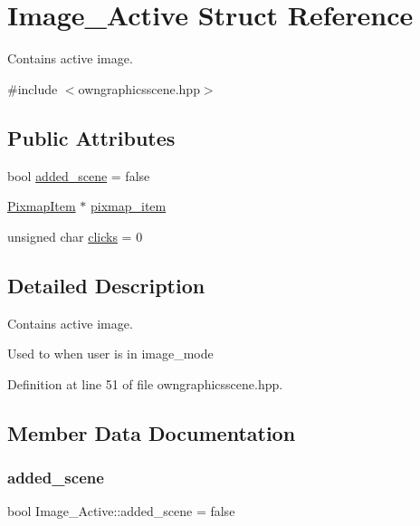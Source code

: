 \hypertarget{structImage__Active}{}\section{Image\+\_\+\+Active Struct Reference}
\label{structImage__Active}


Contains active image.  




{\ttfamily \#include $<$owngraphicsscene.\+hpp$>$}

\subsection*{Public Attributes}
\begin{DoxyCompactItemize}
\item 
bool \mbox{\hyperlink{structImage__Active_ac5eb10f5ca4ad81766c92a6ede6f7853}{added\+\_\+scene}} = false
\item 
\mbox{\hyperlink{classPixmapItem}{Pixmap\+Item}} $\ast$ \mbox{\hyperlink{structImage__Active_aa007ea3c9ba4830bbc2706af51820c20}{pixmap\+\_\+item}}
\item 
unsigned char \mbox{\hyperlink{structImage__Active_abb039226daf0372a8d88c842f5eb140f}{clicks}} = 0
\end{DoxyCompactItemize}


\subsection{Detailed Description}
Contains active image. 

Used to when user is in image\+\_\+mode 

Definition at line 51 of file owngraphicsscene.\+hpp.



\subsection{Member Data Documentation}
\mbox{\label{structImage__Active_ac5eb10f5ca4ad81766c92a6ede6f7853}} 
\subsubsection{\texorpdfstring{added\+\_\+scene}{added\_scene}}
{\footnotesize\ttfamily bool Image\+\_\+\+Active\+::added\+\_\+scene = false}

